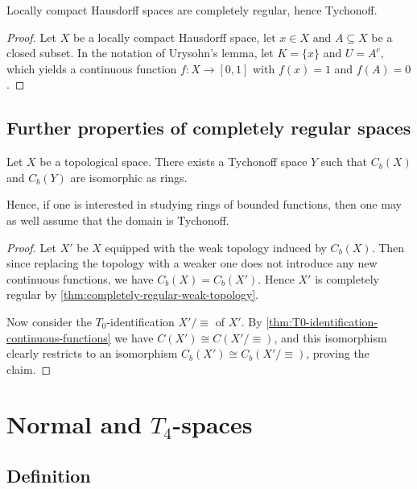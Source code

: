 \documentclass[article, a4paper, 11pt, oneside]{memoir}
\numberwithin{equation}{chapter}
\newcommand{\calT}{\mathcal{T}}
\begin{document}
\begin{corollary}
    Locally compact Hausdorff spaces are completely regular, hence Tychonoff.
\end{corollary}

\begin{proof}
    Let $X$ be a locally compact Hausdorff space, let $x \in X$ and $A \subseteq X$ be a closed subset. In the notation of Urysohn's lemma, let $K = \{x\}$ and $U = A^c$, which yields a continuous function $f \colon X \to [0,1]$ with $f(x) = 1$ and $f(A) = 0$.
\end{proof}


\section{Further properties of completely regular spaces}


\begin{proposition}
    Let $X$ be a topological space. There exists a Tychonoff space $Y$ such that $C_b(X)$ and $C_b(Y)$ are isomorphic as rings.
\end{proposition}
%
Hence, if one is interested in studying rings of bounded functions, then one may as well assume that the domain is Tychonoff.

\begin{proof}
    Let $X'$ be $X$ equipped with the weak topology induced by $C_b(X)$. Then since replacing the topology with a weaker one does not introduce any new continuous functions, we have $C_b(X) = C_b(X')$. Hence $X'$ is completely regular by \cref{thm:completely-regular-weak-topology}.

    Now consider the $T_0$-identification $X'/{\equiv}$ of $X'$. By \cref{thm:T0-identification-continuous-functions} we have $C(X') \cong C(X'/{\equiv})$, and this isomorphism clearly restricts to an isomorphism $C_b(X') \cong C_b(X'/{\equiv})$, proving the claim.
\end{proof}



\chapter[Normal and T4-spaces]{Normal and $T_4$-spaces}

\section{Definition}
\end{document}
